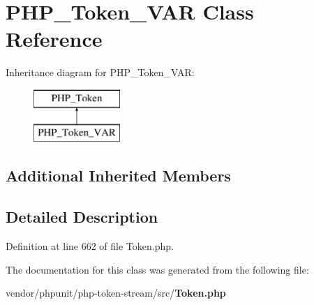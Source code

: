 \section{P\+H\+P\+\_\+\+Token\+\_\+\+V\+A\+R Class Reference}
\label{class_p_h_p___token___v_a_r}
Inheritance diagram for P\+H\+P\+\_\+\+Token\+\_\+\+V\+A\+R\+:\begin{figure}[H]
\begin{center}
\leavevmode
\includegraphics[height=2.000000cm]{class_p_h_p___token___v_a_r}
\end{center}
\end{figure}
\subsection*{Additional Inherited Members}


\subsection{Detailed Description}


Definition at line 662 of file Token.\+php.



The documentation for this class was generated from the following file\+:\begin{DoxyCompactItemize}
\item 
vendor/phpunit/php-\/token-\/stream/src/{\bf Token.\+php}\end{DoxyCompactItemize}
